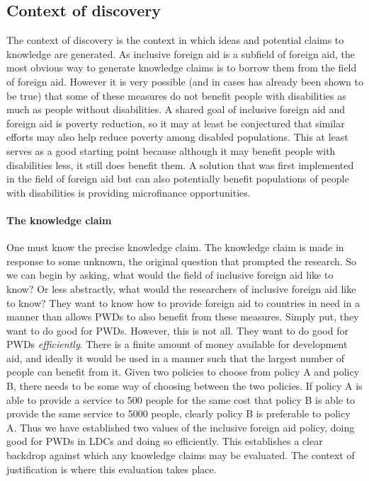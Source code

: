 \documentclass[a4paper]{article}
\begin{document}
\subsection{Context of discovery}

The context of discovery is the context in which ideas and potential claims to
knowledge are generated. As inclusive foreign aid is a subfield of foreign
aid, the most obvious way to generate knowledge claims is to borrow them from
the field of foreign aid. However it is very possible (and in cases has
already been shown to be true) that some of these measures do not benefit
people with disabilities as much as people without disabilities. A shared goal
of inclusive foreign aid and foreign aid is poverty reduction, so it may at
least be conjectured that similar efforts may also help reduce poverty among
disabled populations. This at least serves as a good starting point because
although it may benefit people with disabilities less, it still does benefit
them. A solution that was first implemented in the field of foreign aid but
can also potentially benefit populations of people with disabilities is
providing microfinance opportunities.

\paragraph{The knowledge claim}

One must know the precise knowledge claim. The knowledge claim is made in
response to some unknown, the original question that prompted the research.
So we can begin by asking, what would the field of inclusive foreign aid like
to know? Or less abstractly, what would the researchers of inclusive foreign
aid like to know? They want to know how to provide foreign aid to countries in
need in a manner than allows PWDs to also benefit from these measures. Simply
put, they want to do good for PWDs. However, this is not all. They want to do
good for PWDs \emph{efficiently}. There is a finite amount of money available
for development aid, and ideally it would be used in a manner such that the
largest number of people can benefit from it. Given two policies to choose
from policy A and policy B, there needs to be some way of choosing between the
two policies. If policy A is able to provide a service to 500 people for the
same cost that policy B is able to provide the same service to 5000 people,
clearly policy B is preferable to policy A. Thus we have established two
values of the inclusive foreign aid policy, doing good for PWDs in LDCs and
doing so efficiently. This establishes a clear backdrop against which any
knowledge claims may be evaluated. The context of justification is where this
evaluation takes place.
\end{document}
